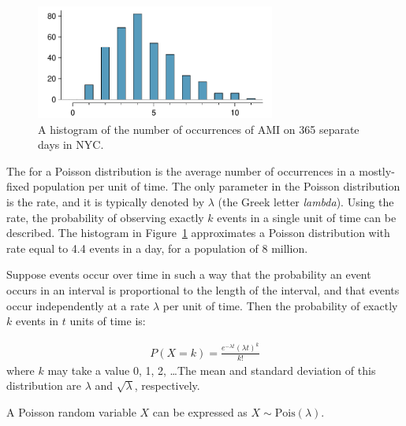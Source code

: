 \begin{figure}[h]
	\centering
	\includegraphics[width=0.7\textwidth]{ch_distributions_oi_biostat/figures/amiIncidencesOver100Days/amiIncidencesOver100Days}
	\caption{A histogram of the number of occurrences of AMI on 365 separate days in NYC.}
	\label{amiIncidencesOver100Days}
\end{figure}

The  for a Poisson distribution is the average number of occurrences in a mostly-fixed population per unit of time. The only parameter in the Poisson distribution is the rate, and it is typically denoted by $\lambda$
(the Greek letter \emph{lambda}). Using the rate, the probability of observing exactly $k$ events in a single unit of time can be described. The histogram in Figure~\ref{amiIncidencesOver100Days} approximates a Poisson distribution with rate equal to 4.4 events in a day, for a population of 8 million. 

\begin{termBox}{
		Suppose events occur over time in such a way that the probability an event occurs in an interval is proportional to the length of the interval, and that events occur independently at a rate $\lambda$ per unit of time. Then the probability of exactly $k$ events in $t$ units of time is:

		\begin{align*}
		P(X = k) = \frac{e^{-\lambda t}(\lambda t)^{k}}{k!}
		\end{align*}
		where $k$ may take a value 0, 1, 2, \dots The mean and standard deviation of this distribution are $\lambda$ and $\sqrt{\lambda}$, respectively.
		
		A Poisson random variable $X$ can be expressed as $X \sim \textrm{Pois}(\lambda)$.
		
		}
\end{termBox}

